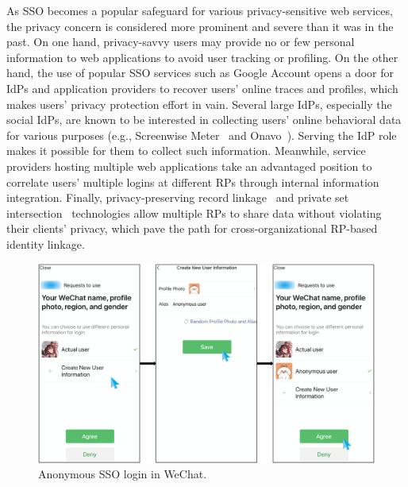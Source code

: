 As SSO becomes a popular safeguard for various privacy-sensitive web services, the privacy concern is considered more prominent and severe than it was in the past. On one hand, privacy-savvy users may provide no or few personal information to web applications to avoid user tracking or profiling. On the other hand, the use of popular SSO services such as Google Account opens a door for IdPs and application providers to recover users' online traces and profiles, which makes users' privacy protection effort in vain. Several large IdPs, especially the social IdPs, are known to be interested in collecting users' online behavioral data for various purposes (e.g., Screenwise Meter~\cite{googlenews} and Onavo~\cite{Onavo}). Serving the IdP role makes it possible for them to collect such information. Meanwhile, service providers hosting multiple web applications take an advantaged position to correlate users' multiple logins at different RPs through internal information integration. Finally, privacy-preserving record linkage~\cite{agrawal2003information} and private set intersection~\cite{de2010practical} technologies allow multiple RPs to share data without violating their clients' privacy, which pave the path for cross-organizational RP-based identity linkage.

\begin{figure}[t]
  \centering
  \includegraphics[width=0.9\linewidth]{fig/wechat.pdf}
  \caption{Anonymous SSO login in WeChat.}
  \label{fig:wechat}
  \vspace{-5mm}
\end{figure}


